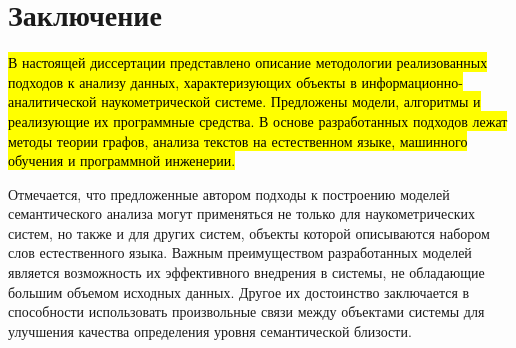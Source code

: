 \chapter*{Заключение}						%


\hl{В настоящей диссертации представлено описание методологии реализованных подходов к анализу данных, характеризующих объекты в  информационно-аналитической наукометрической системе. Предложены модели, алгоритмы и реализующие их программные средства. В основе разработанных подходов лежат методы теории графов, анализа текстов на естественном языке, машинного обучения и программной инженерии.}

Отмечается, что предложенные автором подходы к построению моделей семантического анализа могут применяться не только для наукометрических систем, но также и для других систем, объекты которой описываются набором слов естественного языка. Важным преимуществом разработанных моделей является возможность их эффективного внедрения в системы, не обладающие большим объемом исходных данных. Другое их достоинство заключается в способности использовать произвольные связи между объектами системы для улучшения качества определения уровня семантической близости.

